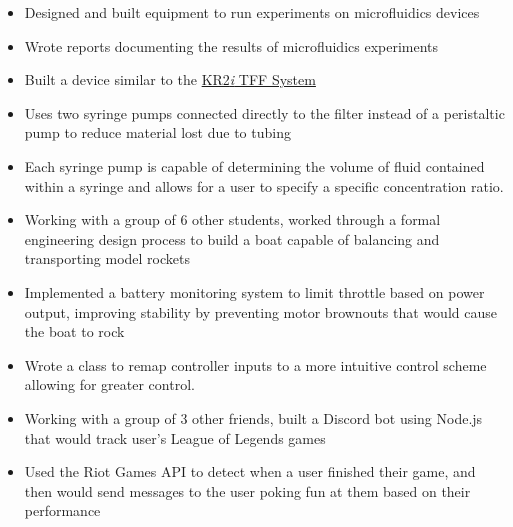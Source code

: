 \documentclass{resume}
\begin{document}
\begin{itemize}
    \item Designed and built equipment to run experiments on microfluidics devices
    \item Wrote reports documenting the results of microfluidics experiments
\end{itemize}

\TechnicalProjects

\begin{itemize}
    \item Built a device similar to the \href{http://spectrumlabs.com/filtration/KR2System.html}{KR2\textit{i} TFF System}
    \item Uses two syringe pumps connected directly to the filter instead of a peristaltic pump to reduce material lost due to tubing
    \item Each syringe pump is capable of determining the volume of fluid contained within a syringe and allows for a user to specify a specific concentration ratio.
\end{itemize}

\begin{itemize}
	\item Working with a group of 6 other students, worked through a formal engineering design process to build a boat capable of balancing and transporting model rockets
	\item Implemented a battery monitoring system to limit throttle based on power output, improving stability by preventing motor brownouts that would cause the boat to rock
	\item Wrote a class to remap controller inputs to a more intuitive control scheme allowing for greater control.
\end{itemize}

\begin{itemize}
	\item Working with a group of 3 other friends, built a Discord bot using Node.js that would track user's League of Legends games
	\item Used the Riot Games API to detect when a user finished their game, and then would send messages to the user poking fun at them based on their performance
\end{itemize}
\end{document}
